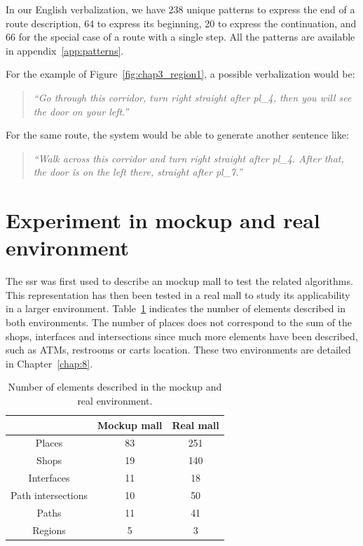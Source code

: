 In our English verbalization, we have 238 unique patterns to express the end of a route description, 64 to express its beginning, 20 to express the continuation, and 66 for the special case of a route with a single step. All the patterns are available in appendix~\ref{app:patterns}.

For the example of Figure~\ref{fig:chap3_region1}, a possible verbalization would be:

\begin{quote} 
\centering 
\textit{
``Go through this corridor, turn right straight after pl\_4, then you will see the door on your left.''}
\end{quote}

For the same route, the system would be able to generate another sentence like:

\begin{quote} 
\centering 
\textit{
``Walk across this corridor and turn right straight after pl\_4. After that, the door is on the left there, straight after pl\_7.''}
\end{quote}

\section{Experiment in mockup and real environment}

The \acrshort{ssr} was first used to describe an mockup mall to test the related algorithms. This representation has then been tested in a real mall to study its applicability in a larger environment. Table~\ref{tab:chap3_count} indicates the number of elements described in both environments. The number of places does not correspond to the sum of the shops, interfaces and intersections since much more elements have been described, such as ATMs, restrooms or carts location. These two environments are detailed in Chapter~\ref{chap:8}.

\begin{table}[!h]
\begin{center}
   \begin{tabular}{ | c || c | c | }
     \hline
                        & Mockup mall & Real mall \\ \hline \hline
     Places             & 83            & 251   \\ \hline
     Shops              & 19            & 140   \\ \hline
     Interfaces         & 11            & 18    \\ \hline
     Path intersections & 10            & 50    \\ \hline
     Paths              & 11            & 41    \\ \hline
     Regions            & 5             & 3     \\
     \hline
   \end{tabular}
 \end{center}
 \caption{\label{tab:chap3_count} Number of elements described in the mockup and real environment.}
\end{table}

